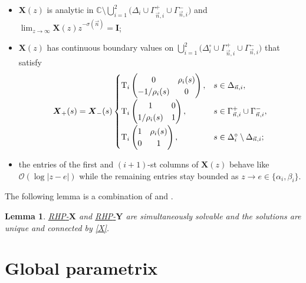 \documentclass[pdftex]{sigma}
\numberwithin{equation}{section}
\newtheorem{Lemma}[Theorem]{Lemma}
\newcommand{\C}		{\mathbb{C}}
\newcommand{\n}{{\vec n}}
\newcommand{\rhy} {\textnormal{RHP}-${\boldsymbol Y}$}
\newcommand{\rhx} {\textnormal{RHP}-${\boldsymbol X}$}
\begin{document}
\begin{itemize}\itemsep=0pt
\item[(a)] $\boldsymbol X(z)$ is analytic in $\C\setminus\bigcup_{i=1}^2\bigl(\Delta_i\cup\Gamma_{\n,i}^+\cup\Gamma_{\n,i}^-\bigr)$ and $ \lim_{z\to\infty} {\boldsymbol X}(z)z^{-\sigma(\n)} = {\boldsymbol I}$;
\item[(b)] $\boldsymbol X(z)$ has continuous boundary values on $\bigcup_{i=1}^2\bigl(\Delta_i^\circ\cup\Gamma_{\n,i}^+\cup\Gamma_{\n,i}^-\bigr)$ that satisfy
\[
{\boldsymbol X}_+(s)={\boldsymbol X}_-(s)
\begin{cases}
\displaystyle \mathrm{T}_i \begin{pmatrix} 0 & \rho_i(s) \\ -1/\rho_i(s) & 0 \end{pmatrix}, & s\in \Delta_{\n,i}, \vspace{0.5mm}\\
\displaystyle \mathrm{T}_i \begin{pmatrix} 1 & 0 \\ 1/\rho_i(s) & 1 \end{pmatrix}, & s\in \Gamma_{\n,i}^+\cup\Gamma_{\n,i}^-, \vspace{0.5mm}\\
\displaystyle \mathrm{T}_i \begin{pmatrix} 1 & \rho_i(s) \\ 0 & 1 \end{pmatrix}, & s\in \Delta_i^\circ\setminus\Delta_{\n,i};
\end{cases}
\]
\item[(c)] the entries of the first and $(i+1)$-st columns of $\boldsymbol X(z)$ behave like $\mathcal{O}\left(\log|z-e|\right)$ while the remaining entries stay bounded as $z\to e\in\{\alpha_i,\beta_i\}$.
\end{itemize}

The following lemma is a combination of \cite[Lemma~8.1]{Ya16} and \cite[Lemma~6.4]{BYa10}.

\begin{Lemma}
\label{rhx}
\hyperref[rhx]{\rhx} and \hyperref[rhy]{\rhy} are simultaneously solvable and the solutions are unique and connected by \eqref{X}.
\end{Lemma}


\section{Global parametrix}
\end{document}
